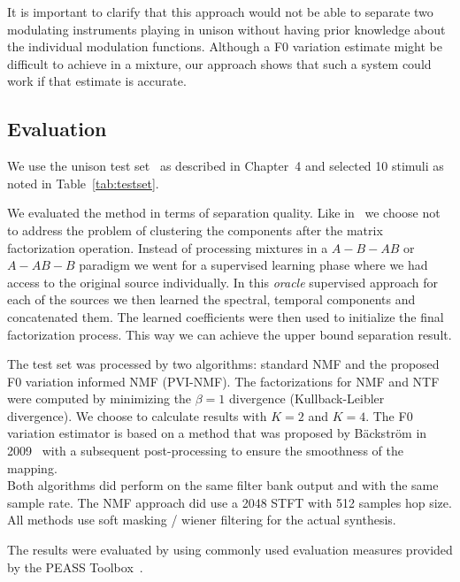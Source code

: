 It is important to clarify that this approach would not be able to separate two modulating instruments playing in unison without having prior knowledge about the individual modulation functions. Although a F0 variation estimate might be difficult to achieve in a mixture, our approach shows that such a system could work if that estimate is accurate.

\subsection{Evaluation}
We use the unison test set~\cite{oss_unison} as described in Chapter~4 and selected 10 stimuli as noted in Table~\ref{tab:testset}.

We evaluated the method in terms of separation quality.
Like in~\cite{barker13} we choose not to address the problem of clustering the components after the matrix factorization operation.
Instead of processing mixtures in a $A-B-AB$ or $A-AB-B$ paradigm we went for a supervised learning phase where we had access to the original source individually.
In this \emph{oracle} supervised approach for each of the sources we then learned the spectral, temporal components and concatenated them. The learned coefficients were then used to initialize the final factorization process. This way we can achieve the upper bound separation result.

The test set was processed by two algorithms: standard NMF and the proposed F0 variation informed NMF (PVI-NMF). The factorizations for NMF and NTF were computed by minimizing the $\beta = 1$ divergence (Kullback-Leibler divergence).
We choose to calculate results with $K=2$ and $K=4$.
The F0 variation estimator is based on a method that was proposed by B\"ackstr\"om in 2009~\cite{backstrom09} with a subsequent post-processing to ensure the smoothness of the mapping. \\

Both algorithms did perform on the same filter bank output and with the same sample rate. The NMF approach did use a 2048 STFT with 512 samples hop size.
All methods use soft masking / wiener filtering for the actual synthesis.

The results were evaluated by using commonly used evaluation measures provided by the {PEASS} Toolbox~\cite{emiya11}. 

